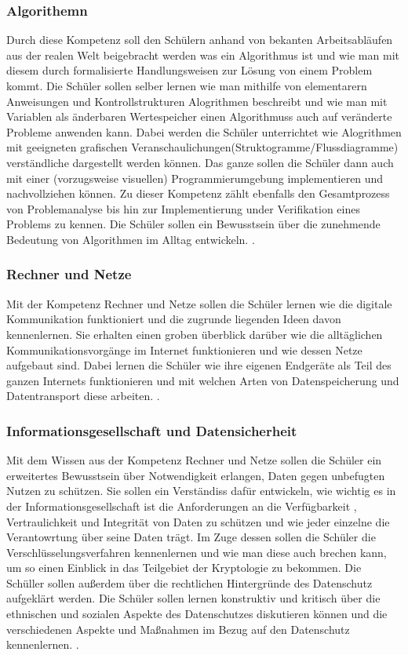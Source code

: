 \subsubsection{Algorithemn}

Durch diese Kompetenz soll den Schülern anhand von bekanten Arbeitsabläufen aus der realen Welt beigebracht werden was ein Algorithmus ist und wie man mit diesem durch formalisierte Handlungsweisen zur Lösung von einem Problem kommt. Die Schüler sollen selber lernen wie man mithilfe von elementarern Anweisungen und Kontrollstrukturen Alogrithmen beschreibt und wie man mit Variablen als änderbaren Wertespeicher einen Algorithmuss auch auf veränderte Probleme anwenden kann. Dabei werden die Schüler unterrichtet wie Alogrithmen mit geeigneten grafischen Veranschaulichungen(Struktogramme/Flussdiagramme) verständliche dargestellt werden können. Das ganze sollen die Schüler dann auch mit einer (vorzugsweise visuellen) Programmierumgebung implementieren und nachvollziehen können. Zu dieser Kompetenz zählt ebenfalls den Gesamtprozess von Problemanalyse bis hin zur Implementierung under Verifikation eines Problems zu kennen. Die Schüler sollen ein Bewusstsein über die zunehmende Bedeutung von Algorithmen im Alltag entwickeln.
\cite{Algo}.

\subsubsection{Rechner und Netze}

Mit der Kompetenz Rechner und Netze sollen die Schüler lernen wie die digitale Kommunikation funktioniert und die zugrunde liegenden Ideen davon kennenlernen. Sie erhalten einen groben überblick darüber wie die alltäglichen Kommunikationsvorgänge im Internet funktionieren und wie dessen Netze aufgebaut sind. Dabei lernen die Schüler wie ihre eigenen Endgeräte als Teil des ganzen Internets funktionieren und mit welchen Arten von Datenspeicherung und Datentransport diese arbeiten.
\cite{Rechner}.

\subsubsection{Informationsgesellschaft und Datensicherheit}

Mit dem Wissen aus der Kompetenz Rechner und Netze sollen die Schüler ein erweitertes Bewusstsein über Notwendigkeit erlangen, Daten gegen unbefugten Nutzen zu schützen. Sie sollen ein Verständiss dafür entwickeln, wie wichtig es in der Informationsgesellschaft ist die Anforderungen an die Verfügbarkeit , Vertraulichkeit und Integrität von Daten zu schützen und wie jeder einzelne die Verantowrtung über seine Daten trägt. Im Zuge dessen sollen die Schüler die Verschlüsselungsverfahren kennenlernen und wie man diese auch brechen kann, um so einen Einblick in das Teilgebiet der Kryptologie zu bekommen. Die Schüller sollen außerdem über die rechtlichen Hintergründe des Datenschutz aufgeklärt werden. Die Schüler sollen lernen konstruktiv und kritisch über die ethnischen und sozialen Aspekte des Datenschutzes diskutieren können und die verschiedenen Aspekte und Maßnahmen im Bezug auf den Datenschutz kennenlernen.
\cite{InfoGes}.

